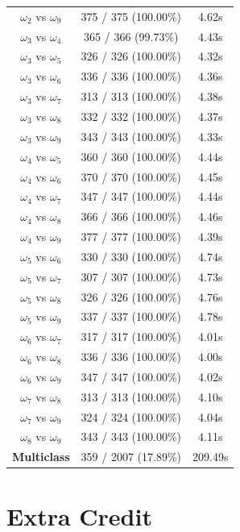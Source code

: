 \documentclass{article}
\begin{document}
\begin{center}
\begin{tabular}{|c|c|c|}
$\omega_2$ vs $\omega_9$ & 375 / 375 (100.00\%) & 4.62s \\
$\omega_3$ vs $\omega_4$ & 365 / 366 (99.73\%) & 4.43s \\
$\omega_3$ vs $\omega_5$ & 326 / 326 (100.00\%) & 4.32s \\
$\omega_3$ vs $\omega_6$ & 336 / 336 (100.00\%) & 4.36s \\
$\omega_3$ vs $\omega_7$ & 313 / 313 (100.00\%) & 4.38s \\
$\omega_3$ vs $\omega_8$ & 332 / 332 (100.00\%) & 4.37s \\
$\omega_3$ vs $\omega_9$ & 343 / 343 (100.00\%) & 4.33s \\
$\omega_4$ vs $\omega_5$ & 360 / 360 (100.00\%) & 4.44s \\
$\omega_4$ vs $\omega_6$ & 370 / 370 (100.00\%) & 4.45s \\
$\omega_4$ vs $\omega_7$ & 347 / 347 (100.00\%) & 4.44s \\
$\omega_4$ vs $\omega_8$ & 366 / 366 (100.00\%) & 4.46s \\
$\omega_4$ vs $\omega_9$ & 377 / 377 (100.00\%) & 4.39s \\
$\omega_5$ vs $\omega_6$ & 330 / 330 (100.00\%) & 4.74s \\
$\omega_5$ vs $\omega_7$ & 307 / 307 (100.00\%) & 4.73s \\
$\omega_5$ vs $\omega_8$ & 326 / 326 (100.00\%) & 4.76s \\
$\omega_5$ vs $\omega_9$ & 337 / 337 (100.00\%) & 4.78s \\
$\omega_6$ vs $\omega_7$ & 317 / 317 (100.00\%) & 4.01s \\
$\omega_6$ vs $\omega_8$ & 336 / 336 (100.00\%) & 4.00s \\
$\omega_6$ vs $\omega_9$ & 347 / 347 (100.00\%) & 4.02s \\
$\omega_7$ vs $\omega_8$ & 313 / 313 (100.00\%) & 4.10s \\
$\omega_7$ vs $\omega_9$ & 324 / 324 (100.00\%) & 4.04s \\
$\omega_8$ vs $\omega_9$ & 343 / 343 (100.00\%) & 4.11s \\ \hline
{\bf Multiclass} & 359 / 2007 (17.89\%)  & 209.49s\\ \hline 
\end{tabular}
\end{center}



\section{Extra Credit}
\end{document}
